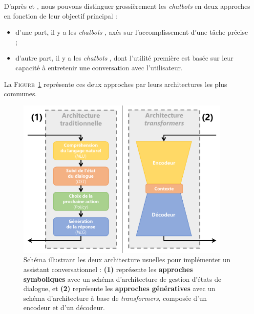 	
	D'après \cite{chen-etal:2017:survey-dialogue-systems} et \cite{adamopoulou-moussiades:2020:overview-chatbot-technology}, nous pouvons distinguer grossièrement les \textit{chatbots} en deux approches en fonction de leur objectif principal :
	\begin{itemize}
		\item d'une part, il y a les \textit{chatbots} , axés sur l'accomplissement d'une tâche précise ;
		\item d'autre part, il y a les \textit{chatbots} , dont l'utilité première est basée sur leur capacité à entretenir une conversation avec l'utilisateur.
	\end{itemize}
	
	La \textsc{Figure~\ref{figure:B.2-CHATBOT-ARCHITECTURES}} représente ces deux approches par leurs architectures les plus communes.
	\begin{figure}[!htb]
		\centering
		\includegraphics[width=0.95\textwidth]{figures/annexe-chatbots-architectures}
		\caption{
			Schéma illustrant les deux architecture usuelles pour implémenter un assistant conversationnel :
			\textbf{(1)} représente les \textbf{approches symboliques} avec un schéma d'architecture de gestion d'états de dialogue,
			et \textbf{(2)} représente les \textbf{approches génératives} avec un schéma d'architecture à base de \textit{transformers}, composée d'un encodeur et d'un décodeur.
		}
		\label{figure:B.2-CHATBOT-ARCHITECTURES}
	\end{figure}
	
